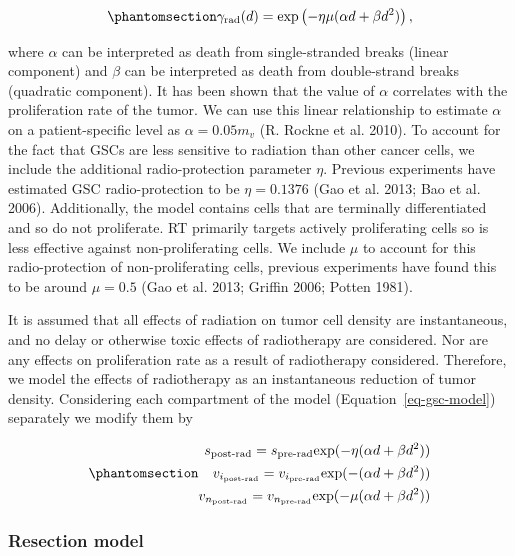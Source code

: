 \documentclass[
  default,
]{sn-jnl}
\begin{document}
\begin{equation}\phantomsection\label{eq-LQ-model}{
    \gamma_{\text{rad}}(d) = \text{exp}\left(-\eta \mu (\alpha d + \beta d^2)\right),
}\end{equation}

where \(\alpha\) can be interpreted as death from single-stranded breaks
(linear component) and \(\beta\) can be interpreted as death from
double-strand breaks (quadratic component). It has been shown that the
value of \(\alpha\) correlates with the proliferation rate of the tumor.
We can use this linear relationship to estimate \(\alpha\) on a
patient-specific level as \(\alpha = 0.05m_v\) (R. Rockne et al. 2010).
To account for the fact that GSCs are less sensitive to radiation than
other cancer cells, we include the additional radio-protection parameter
\(\eta\). Previous experiments have estimated GSC radio-protection to be
\(\eta = 0.1376\) (Gao et al. 2013; Bao et al. 2006). Additionally, the
model contains cells that are terminally differentiated and so do not
proliferate. RT primarily targets actively proliferating cells so is
less effective against non-proliferating cells. We include \(\mu\) to
account for this radio-protection of non-proliferating cells, previous
experiments have found this to be around \(\mu = 0.5\) (Gao et al. 2013;
Griffin 2006; Potten 1981).

It is assumed that all effects of radiation on tumor cell density are
instantaneous, and no delay or otherwise toxic effects of radiotherapy
are considered. Nor are any effects on proliferation rate as a result of
radiotherapy considered. Therefore, we model the effects of radiotherapy
as an instantaneous reduction of tumor density. Considering each
compartment of the model (Equation~\ref{eq-gsc-model}) separately we
modify them by

\begin{equation}\phantomsection\label{eq-radiation_model}{ 
  \begin{aligned}
    s_\text{post-rad} = s_\text{pre-rad} \text{exp}(-\eta(\alpha d + \beta d^2)) \\ 
    v_{i_\text{post-rad}} = v_{i_\text{pre-rad}} \text{exp}(-(\alpha d + \beta d^2)) \\ 
    v_{n_\text{post-rad}} = v_{n_\text{pre-rad}} \text{exp}(-\mu(\alpha d + \beta d^2))
  \end{aligned} 
}\end{equation}

\subsubsection{Resection model}\label{sec-resection-model}
\end{document}

